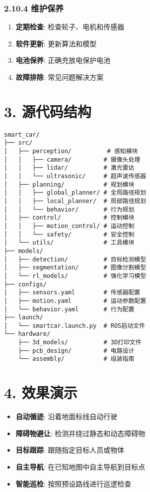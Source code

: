 \subsubsection{2.10.4 维护保养}\label{ux7ef4ux62a4ux4fddux517b}

\begin{enumerate}
\def\labelenumi{\arabic{enumi}.}
\tightlist
\item
  \textbf{定期检查}: 检查轮子、电机和传感器
\item
  \textbf{软件更新}: 更新算法和模型
\item
  \textbf{电池保养}: 正确充放电保护电池
\item
  \textbf{故障排除}: 常见问题解决方案
\end{enumerate}

\section{3. 源代码结构}\label{ux6e90ux4ee3ux7801ux7ed3ux6784}

\begin{lstlisting}
smart_car/
├── src/
│   ├── perception/          # 感知模块
│   │   ├── camera/         # 摄像头处理
│   │   ├── lidar/          # 激光雷达
│   │   └── ultrasonic/     # 超声波传感器
│   ├── planning/           # 规划模块
│   │   ├── global_planner/ # 全局路径规划
│   │   ├── local_planner/  # 局部路径规划
│   │   └── behavior/       # 行为规划
│   ├── control/            # 控制模块
│   │   ├── motion_control/ # 运动控制
│   │   └── safety/         # 安全控制
│   └── utils/              # 工具模块
├── models/
│   ├── detection/          # 目标检测模型
│   ├── segmentation/       # 图像分割模型
│   └── rl_models/          # 强化学习模型
├── configs/
│   ├── sensors.yaml        # 传感器配置
│   ├── motion.yaml         # 运动参数配置
│   └── behavior.yaml       # 行为配置
├── launch/
│   └── smartcar.launch.py  # ROS启动文件
└── hardware/
    ├── 3d_models/          # 3D打印文件
    ├── pcb_design/         # 电路设计
    └── assembly/           # 组装指南
\end{lstlisting}

\section{4. 效果演示}\label{ux6548ux679cux6f14ux793a}

\begin{itemize}
\tightlist
\item
  \textbf{自动循迹}: 沿着地面标线自动行驶
\item
  \textbf{障碍物避让}: 检测并绕过静态和动态障碍物
\item
  \textbf{目标跟踪}: 跟随指定目标人员或物体
\item
  \textbf{自主导航}: 在已知地图中自主导航到目标点
\item
  \textbf{智能巡检}: 按照预设路线进行巡逻检查
\end{itemize}
